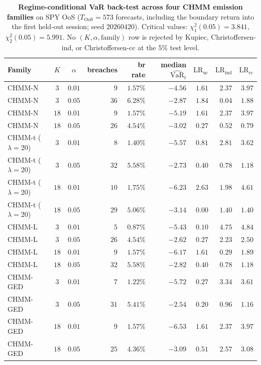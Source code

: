 \begin{table}[!ht]
\centering
\small
\caption{\textbf{Regime-conditional VaR back-test across four CHMM emission families} on SPY OoS ($T_{\text{OoS}} = 573$ forecasts, including the boundary return into the first held-out session; seed $20260420$). Critical values: $\chi^2_1(0.05) = 3.841$, $\chi^2_2(0.05) = 5.991$. No $(K, \alpha, \text{family})$ row is rejected by Kupiec, Christoffersen-ind, or Christoffersen-cc at the $5\%$ test level.}
\label{tab:cond_var_all_families}
\begin{tabular}{l c c r r r r r r}
\toprule
Family & $K$ & $\alpha$ & breaches & br rate & median $\widehat{\text{VaR}}_t$ & $\text{LR}_{\text{uc}}$ & $\text{LR}_{\text{ind}}$ & $\text{LR}_{\text{cc}}$ \\
\midrule
CHMM-N             & $3$  & $0.01$ & $9$  & $1.57\%$ & $-4.56$ & $1.61$ & $2.37$ & $3.97$ \\
CHMM-N             & $3$  & $0.05$ & $36$ & $6.28\%$ & $-2.87$ & $1.84$ & $0.04$ & $1.88$ \\
CHMM-N             & $18$ & $0.01$ & $9$  & $1.57\%$ & $-5.19$ & $1.61$ & $2.37$ & $3.97$ \\
CHMM-N             & $18$ & $0.05$ & $26$ & $4.54\%$ & $-3.02$ & $0.27$ & $0.52$ & $0.79$ \\
CHMM-t ($\lambda=20$) & $3$  & $0.01$ & $8$  & $1.40\%$ & $-5.57$ & $0.81$ & $2.81$ & $3.62$ \\
CHMM-t ($\lambda=20$) & $3$  & $0.05$ & $32$ & $5.58\%$ & $-2.73$ & $0.40$ & $0.78$ & $1.18$ \\
CHMM-t ($\lambda=20$) & $18$ & $0.01$ & $10$ & $1.75\%$ & $-6.23$ & $2.63$ & $1.98$ & $4.61$ \\
CHMM-t ($\lambda=20$) & $18$ & $0.05$ & $29$ & $5.06\%$ & $-3.14$ & $0.00$ & $1.40$ & $1.40$ \\
CHMM-L             & $3$  & $0.01$ & $5$  & $0.87\%$ & $-5.43$ & $0.10$ & $4.75$ & $4.84$ \\
CHMM-L             & $3$  & $0.05$ & $26$ & $4.54\%$ & $-2.62$ & $0.27$ & $2.23$ & $2.50$ \\
CHMM-L             & $18$ & $0.01$ & $9$  & $1.57\%$ & $-6.17$ & $1.61$ & $0.29$ & $1.89$ \\
CHMM-L             & $18$ & $0.05$ & $32$ & $5.58\%$ & $-2.82$ & $0.40$ & $0.78$ & $1.18$ \\
CHMM-GED           & $3$  & $0.01$ & $7$  & $1.22\%$ & $-5.72$ & $0.27$ & $3.34$ & $3.61$ \\
CHMM-GED           & $3$  & $0.05$ & $31$ & $5.41\%$ & $-2.54$ & $0.20$ & $0.96$ & $1.16$ \\
CHMM-GED           & $18$ & $0.01$ & $9$  & $1.57\%$ & $-6.53$ & $1.61$ & $2.37$ & $3.97$ \\
CHMM-GED           & $18$ & $0.05$ & $25$ & $4.36\%$ & $-3.09$ & $0.51$ & $2.57$ & $3.08$ \\
\bottomrule
\end{tabular}
\end{table}

